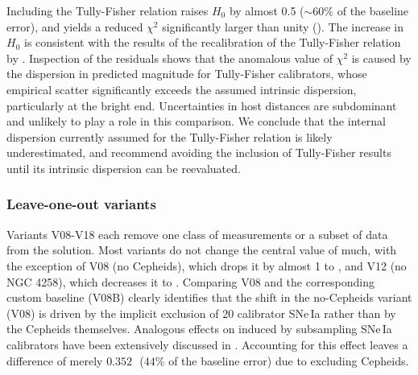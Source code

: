 Including the Tully-Fisher relation raises $ H_0 $ by almost 0.5 {\Hunit} ($\sim 60\%$ of the baseline error), and yields a reduced $ \chi^2 $ significantly larger than unity (\redchisqtf). The increase in $ H_0 $ is consistent with the results of the recalibration of the Tully-Fisher relation by \cite{2024arXiv241208449S}.  Inspection of the residuals shows that the anomalous value of $ \chi^2 $ is caused by the dispersion in predicted magnitude for Tully-Fisher calibrators, whose empirical scatter significantly exceeds the assumed intrinsic dispersion, particularly at the bright end. Uncertainties in host distances are subdominant and unlikely to play a role in this comparison. We conclude that the internal dispersion currently assumed for the Tully-Fisher relation is likely underestimated, and recommend avoiding the inclusion of Tully-Fisher results until its intrinsic dispersion can be reevaluated.

 \subsubsection {Leave-one-out variants\label{sec:leave-one-out}}

Variants V08-V18 each remove one class of measurements or a subset of data from the solution.  Most variants do not change the central value of {\Hcst} much, with the exception of V08 (no Cepheids), which drops it by almost 1 {\Hunit} to {\Hvaluenoceph} {\Hunit}, and V12 (no NGC 4258), which decreases it to {\Hvaluenoftfe} {\Hunit}. 
Comparing V08 and the corresponding custom baseline (V08B) clearly identifies that the shift in the no-Cepheids variant (V08) is driven by the implicit exclusion of 20 calibrator SNe\,Ia rather than by the Cepheids themselves. Analogous effects on \Hcst{} induced by subsampling SNe\,Ia calibrators have been extensively discussed in \citet{2024ApJ...977..120R}. Accounting for this effect leaves a difference of merely $0.352$\,\Hunit\ ($44\%$ of the baseline error) due to excluding Cepheids.

